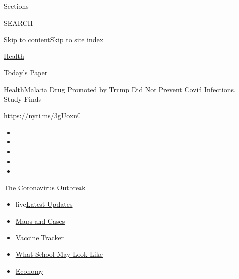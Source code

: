 Sections

SEARCH

\protect\hyperlink{site-content}{Skip to
content}\protect\hyperlink{site-index}{Skip to site index}

\href{https://www.nytimes.com/section/health}{Health}

\href{https://myaccount.nytimes.com/auth/login?response_type=cookie\&client_id=vi}{}

\href{https://www.nytimes.com/section/todayspaper}{Today's Paper}

\href{/section/health}{Health}\textbar{}Malaria Drug Promoted by Trump
Did Not Prevent Covid Infections, Study Finds

\url{https://nyti.ms/3gUoxn0}

\begin{itemize}
\item
\item
\item
\item
\item
\end{itemize}

\href{https://www.nytimes.com/news-event/coronavirus?action=click\&pgtype=Article\&state=default\&region=TOP_BANNER\&context=storylines_menu}{The
Coronavirus Outbreak}

\begin{itemize}
\tightlist
\item
  live\href{https://www.nytimes.com/2020/08/01/world/coronavirus-covid-19.html?action=click\&pgtype=Article\&state=default\&region=TOP_BANNER\&context=storylines_menu}{Latest
  Updates}
\item
  \href{https://www.nytimes.com/interactive/2020/us/coronavirus-us-cases.html?action=click\&pgtype=Article\&state=default\&region=TOP_BANNER\&context=storylines_menu}{Maps
  and Cases}
\item
  \href{https://www.nytimes.com/interactive/2020/science/coronavirus-vaccine-tracker.html?action=click\&pgtype=Article\&state=default\&region=TOP_BANNER\&context=storylines_menu}{Vaccine
  Tracker}
\item
  \href{https://www.nytimes.com/interactive/2020/07/29/us/schools-reopening-coronavirus.html?action=click\&pgtype=Article\&state=default\&region=TOP_BANNER\&context=storylines_menu}{What
  School May Look Like}
\item
  \href{https://www.nytimes.com/live/2020/07/31/business/stock-market-today-coronavirus?action=click\&pgtype=Article\&state=default\&region=TOP_BANNER\&context=storylines_menu}{Economy}
\end{itemize}

